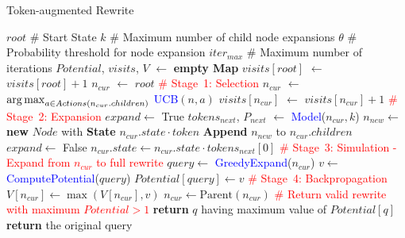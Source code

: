 \begin{algorithm}[!t]
\caption{Token-augmented Rewrite}
\label{alg:mcts}
\begin{algorithmic}[1]
\footnotesize
\REQUIRE 
\Statex $root$ \hspace{0.73cm} \# Start State
\Statex $k$ \hspace{1.1cm} \# Maximum number of child node expansions
\Statex $\theta$ \hspace{1.1cm} \# Probability threshold for node expansion
\Statex $iter_{max}$ \hspace{0.28cm} \# Maximum number of iterations
\smallskip
\State $Potential$, $visits$, $V$ $\gets$ \textbf{empty Map}
    \State $visits[root]$ $\gets$ $visits[root] + 1$
    \State $n_{cur}$ $\gets$ $root$
    \State\textcolor{red}{\# Stage~1: Selection}
        \State $n_{cur}$ $\gets$ $\operatorname*{arg\,max}_{a \in Actions(n_{cur}.children)}$ \textcolor{blue}{UCB}$(n, a)$
        \State $visits[n_{cur}]$ $\gets$ $visits[n_{cur}] + 1$
    \EndWhile
    \State\textcolor{red}{\# Stage~2: Expansion}
    \State $expand \gets$  True
        \State $tokens_{next}$, $P_{next}$ $\gets$ \textcolor{blue}{Model}($n_{cur},k$)
                \State $n_{new} \gets$ \textbf{new} $Node$ with \textbf{State} $n_{cur}.state \cdot token$
                \State \textbf{Append} $n_{new}$ to $n_{cur}.children$
            \EndFor
            \State $expand \gets$  False
        \Else
            \State $n_{cur}.state \gets n_{cur}.state \cdot tokens_{next}[0]$
        \EndIf
    \EndWhile
    \State\textcolor{red}{\# Stage~3: Simulation - Expand from $n_{cur}$ to full rewrite}
    \State $query \gets$ \textcolor{blue}{GreedyExpand}($n_{cur}$)
    \State $v \gets$ \textcolor{blue}{ComputePotential}($query$)
    \State $Potential[query] \gets v$
    \State \textcolor{red}{\# Stage~4: Backpropagation}
        \State $V[n_{cur}] \gets \max(V[n_{cur}], v)$
        \State $n_{cur} \gets \text{Parent}(n_{cur})$
    \EndWhile
\EndFor
\State\textcolor{red}{\# Return valid rewrite with maximum $Potential > 1$}
    \State \textbf{return} $q$ having maximum value of $Potential[q]$
\Else
    \State \textbf{return} the original query
\EndIf
\end{algorithmic}
\end{algorithm}